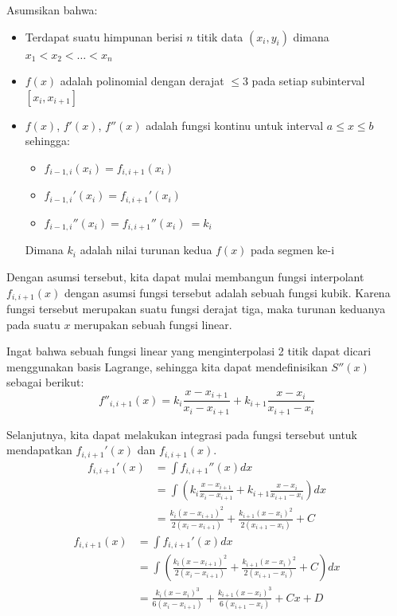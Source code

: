 \documentclass[journal,12pt,onecolumn,a4paper]{IEEEtran}
\begin{document}
Asumsikan bahwa:
\begin{itemize}
	\item Terdapat suatu himpunan berisi \(n\) titik data \((x_i, y_i)\) dimana \(x_1 < x_2 < \dots < x_n\)
	\item \(f(x)\) adalah polinomial dengan derajat \(\leq 3\) pada setiap subinterval \([x_i, x_{i + 1}]\)
	\item \(f(x)\), \(f'(x)\), \(f''(x)\) adalah fungsi kontinu untuk interval \(a \leq x \leq b\) sehingga:
	      \begin{itemize}
		      \item \(f_{i-1,i}(x_i) = f_{i, i+1}(x_i)\)
		      \item \(f_{i-1,i}'(x_i) = f_{i, i+1}'(x_i)\)
		      \item \(f_{i-1,i}''(x_i) = f_{i, i+1}''(x_i)\ = k_i\)
	      \end{itemize}
	      Dimana \(k_i\) adalah nilai turunan kedua \(f(x)\) pada segmen ke-i
\end{itemize}

Dengan asumsi tersebut, kita dapat mulai membangun fungsi interpolant \(f_{i, i+1}(x)\) dengan asumsi fungsi tersebut adalah sebuah fungsi kubik. Karena fungsi tersebut merupakan suatu fungsi derajat tiga, maka turunan keduanya pada suatu \(x\) merupakan sebuah fungsi linear.

Ingat bahwa sebuah fungsi linear yang menginterpolasi 2 titik dapat dicari menggunakan basis Lagrange, sehingga kita dapat mendefinisikan \(S''(x)\) sebagai berikut:
\begin{equation}
	f''_{i, i+1}(x) = k_i\frac{x-x_{i + 1}}{x_i - x_{i + 1}} + k_{i+1}\frac{x - x_i}{x_{i + 1} - x_i}
\end{equation}

Selanjutnya, kita dapat melakukan integrasi pada fungsi tersebut untuk mendapatkan \(f_{i, i+1}'(x)\) dan \(f_{i, i+1}(x)\).
\begin{equation}
	\begin{split}
		f_{i, i+1}'(x) & = \int f_{i, i+1}''(x) dx\\
		& = \int (k_i\frac{x-x_{i + 1}}{x_i - x_{i + 1}} + k_{i+1}\frac{x - x_i}{x_{i + 1} - x_i})dx\\
		& = \frac{k_i(x-x_{i+1})^2}{2(x_i-x_{i+1})} + \frac{k_{i+1}(x-x_{i})^2}{2(x_{i+1}-x_{i})} + C
	\end{split}
\end{equation}
\begin{equation}
	\begin{split}
		f_{i, i+1}(x) & = \int f_{i, i+1}'(x) dx\\
		& = \int (\frac{k_i(x-x_{i+1})^2}{2(x_i-x_{i+1})} + \frac{k_{i+1}(x-x_{i})^2}{2(x_{i+1}-x_{i})} + C)dx\\
		& = \frac{k_i(x-x_i)^3}{6(x_i - x_{i+1})} + \frac{k_{i+1}(x - x_i)^3}{6(x_{i+1} - x_i)} + Cx + D
	\end{split}
\end{equation}
\end{document}
